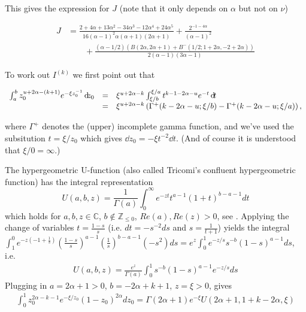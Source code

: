 This gives the expression for $J$ (note that it only depends on $\alpha$ but not on $\nu$)

\begin{align*}
J&=\frac{2 + 4 \alpha + 13 \alpha^2 - 34 \alpha^3 - 12\alpha^4 + 
	24 \alpha^5}{16(\alpha-1)^2 \alpha (\alpha+1) (2\alpha+1)} +  \frac{2^{-1 - 
		4 \alpha}}{(\alpha - 1)^2} \\
	&\qquad+ \frac{(\alpha - 1/2) (B(2 \alpha, 2 \alpha + 1) + 
	B^-(1/2; 1 + 2 \alpha, -2 + 2 \alpha))}{2 (\alpha - 1) (3 \alpha - 1)}
\end{align*}


\vspace{1em}

\noindent
To work out $I^{(k)}$ we first point out that

\[ \begin{array}{rcl} 
\int_a^b z_0^{u+2\alpha-(k+1)} e^{-\xi z_0^{-1}} {\operatorname{\, \mathrm{d}\hspace{-2pt}}} z_0
& = & 
\xi^{u+2\alpha-k} \int_{\xi/b}^{\xi/a} t^{k-1-2\alpha-u} e^{-t} {\operatorname{\, \mathrm{d}\hspace{-2pt}}} t \\
& = & 
\xi^{u+2\alpha-k} \left( \Gamma^+( k-2\alpha-u;\xi/{{\color{black} b}}) - \Gamma^+( k-2\alpha-u; \xi/{{\color{black} a}}) \right), 
\end{array} \]

\noindent
where $\Gamma^+$ denotes the (upper) incomplete gamma function, and we've used the subsitution
$t = \xi / z_0$ which gives ${\dd} z_0 = -\xi t^{-2} {\dd} t$. (And of course it is understood that 
$\xi/0 = \infty$.)



The hypergeometric U-function 
(also called Tricomi's confluent hypergeometric function) has the integral representation 
$$U(a,b,z) = \frac{1}{\Gamma(a)} \int_0^\infty e^{-zt} t^{a-1} (1+t)^{b-a-1} dt$$ which holds for $a,b,z\in \mathbb{C}$, $b \not \in \mathbb{Z}_{\leq 0}$, $Re(a), Re(z) >0$, see \cite[p.255]{Erdelyi1953}. Applying the change of variables 
$t=\frac{1-s}{s}$ (i.e. $dt = -s^{-2} ds$ and $s = \frac{1}{t+1}$) yields the integral 
$\int_1^0 e^{-z(-1+\frac{1}{s})} (\frac{1-s}{s})^{a-1} (\frac{1}{s})^{b-a-1} (-s^2)ds = e^z\int_0^1 e^{-z/s} s^{-b}(1-s)^{a-1} ds$, i.e.
\begin{align*}
U(a,b,z) = \frac{e^z}{\Gamma(a)} \int_0^1 s^{-b} (1-s)^{a-1} e^{-z/s} ds
\end{align*}
Plugging in $a=2\alpha+1 >0$, $b=-2\alpha+k+1$, $z=\xi>0$, gives
\begin{align*}
\int_0^1 z_0^{2\alpha-k-1} e^{-\xi/z_0} (1-z_0)^{2\alpha} dz_0 = \Gamma(2\alpha+1)e^{-\xi} U(2\alpha+1,1+k-2\alpha,\xi)
\end{align*}

